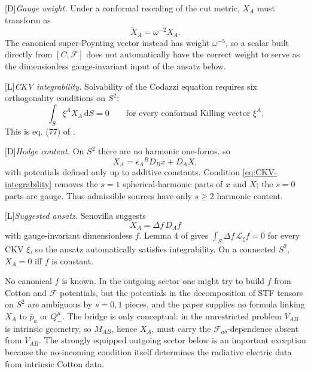 \documentclass[11pt,a4paper]{article}
\newcommand{\cF}{\mathcal{F}}
\newcommand{\mathpounds}{\mathcal{L}}
\newcommand{\diff}{\mathrm{d}}
\newcommand{\statusL}{\textsf{[L]}}
\newcommand{\statusD}{\textsf{[D]}}
\begin{document}
\statusD \textsl{Gauge weight.}  Under a conformal rescaling of the cut metric, \(X_A\) must transform as
\begin{equation}
  \tilde X_A=\omega^{-2}X_A .
\end{equation}
The canonical super-Poynting vector instead has weight \(\omega^{-5}\), so a scalar built directly from \([C,\cF]\) does not automatically have the correct weight to serve as the dimensionless gauge-invariant input of the ansatz below.

\statusL \textsl{CKV integrability.}  Solvability of the Codazzi equation requires six orthogonality conditions on \(S^2\):
\begin{equation}\label{eq:CKV-integrability}
  \int_S \xi^A X_A\,\diff S=0
  \qquad
  \text{for every conformal Killing vector }\xi^A .
\end{equation}
This is eq. (77) of \cite{senovilla2022radiation}.

\statusD \textsl{Hodge content.}  On \(S^2\) there are no harmonic one-forms, so
\begin{equation}
  X_A=\epsilon_A{}^B D_B x+D_A X ,
\end{equation}
with potentials defined only up to additive constants.  Condition \eqref{eq:CKV-integrability} removes the \(s=1\) spherical-harmonic parts of \(x\) and \(X\); the \(s=0\) parts are gauge.  Thus admissible sources have only \(s\ge2\) harmonic content.

\statusL \textsl{Suggested ansatz.}  Senovilla suggests
\begin{equation}\label{eq:X-ansatz}
  X_A=\Delta f\,D_A f
\end{equation}
with gauge-invariant dimensionless \(f\).  Lemma 4 of \cite{senovilla2022radiation} gives \(\int_S \Delta f\,\mathpounds_\xi f=0\) for every CKV \(\xi\), so the ansatz automatically satisfies integrability.  On a connected \(S^2\), \(X_A=0\) iff \(f\) is constant.

No canonical \(f\) is known.  In the outgoing sector one might try to build \(f\) from Cotton and \(\cF\) potentials, but the potentials in the decomposition of STF tensors on \(S^2\) are ambiguous by \(s=0,1\) pieces, and the paper supplies no formula linking \(X_A\) to \(\bar p_a\) or \(Q_-^\mu\).  The bridge is only conceptual: in the unrestricted problem \(V_{AB}\) is intrinsic geometry, so \(M_{AB}\), hence \(X_A\), must carry the \(\cF_{ab}\)-dependence absent from \(V_{AB}\).  The strongly equipped outgoing sector below is an important exception because the no-incoming condition itself determines the radiative electric data from intrinsic Cotton data.
\end{document}
